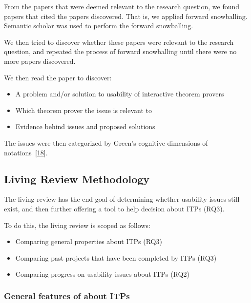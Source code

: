 \documentclass[
]{article}
\providecommand{\tightlist}{%
  \setlength{\itemsep}{0pt}\setlength{\parskip}{0pt}}
\begin{document}
From the papers that were deemed relevant to the research question, we
found papers that cited the papers discovered. That is, we applied
forward snowballing. Semantic scholar was used to perform the forward
snowballing.

We then tried to discover whether these papers were relevant to the
research question, and repeated the process of forward snowballing until
there were no more papers discovered.

We then read the paper to discover:

\begin{itemize}
\tightlist
\item
  A problem and/or solution to usability of interactive theorem provers
\item
  Which theorem prover the issue is relevant to
\item
  Evidence behind issues and proposed solutions
\end{itemize}

The issues were then categorized by Green's cognitive dimensions of
notations~{[}\protect\hyperlink{ref-green_usability_1996}{18}{]}.

\hypertarget{living-review-methodology}{%
\subsection{Living Review Methodology}\label{living-review-methodology}}

The living review has the end goal of determining whether usability
issues still exist, and then further offering a tool to help decision
about ITPs (RQ3).

To do this, the living review is scoped as follows:

\begin{itemize}
\tightlist
\item
  Comparing general properties about ITPs (RQ3)
\item
  Comparing past projects that have been completed by ITPs (RQ3)
\item
  Comparing progress on usability issues about ITPs (RQ2)
\end{itemize}

\hypertarget{general-features-of-about-itps}{%
\subsubsection{General features of about
ITPs}\label{general-features-of-about-itps}}
\end{document}
